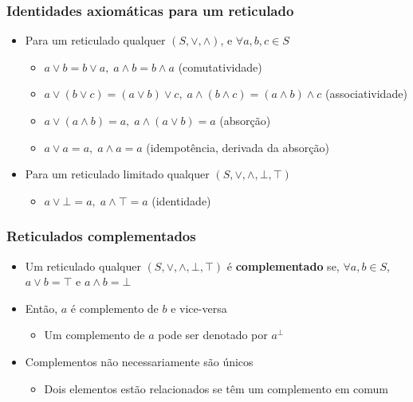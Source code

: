 \documentclass[12pt]{beamer}
\begin{document}
\begin{frame}
  \frametitle{Identidades axiomáticas para um reticulado}
  \begin{itemize}
    \item<1-> Para um reticulado qualquer $(S, \vee, \wedge)$, e $\forall a, b,
        c \in S$
    \begin{itemize}[itemsep=0pt]
      \item<2-> $a \vee b = b \vee a,\; a \wedge b = b \wedge a$
          (comutatividade)
      \item<3-> $a \vee (b \vee c) = (a \vee b) \vee c,\; a \wedge (b \wedge c)
          = (a \wedge b) \wedge c$ (associatividade)
      \item<4-> $a \vee (a \wedge b) = a,\; a \wedge (a \vee b) = a$ (absorção)
      \item<5-> $a \vee a = a,\; a \wedge a = a$ (idempotência, derivada da
          absorção)
    \end{itemize}
    \item<6-> Para um reticulado limitado qualquer $(S, \vee, \wedge, \bot,
        \top)$
    \begin{itemize}
      \item<7-> $a \vee \bot = a,\; a \wedge \top = a$ (identidade)
    \end{itemize}
  \end{itemize}
\end{frame}

\begin{frame}
  \frametitle{Reticulados complementados}
  \begin{itemize}
    \item Um reticulado qualquer $(S, \vee, \wedge, \bot, \top)$ é
        \textbf{complementado} se, $\forall a, b \in S$, $a \vee b = \top$ e $a
          \wedge b = \bot$
    \item Então, $a$ é complemento de $b$ e vice-versa
    \begin{itemize}
      \item Um complemento de $a$ pode ser denotado por $a^{\bot}$
    \end{itemize}
    \item Complementos não necessariamente são únicos
    \begin{itemize}
      \item Dois elementos estão relacionados se têm um complemento em comum
    \end{itemize}
  \end{itemize}
\end{frame}
\end{document}
